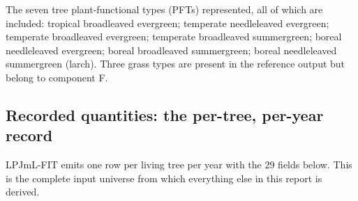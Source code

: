 \documentclass[11pt]{article}
\begin{document}
The seven tree plant-functional types (PFTs) represented, all of which are included: tropical broadleaved evergreen; temperate needleleaved evergreen; temperate broadleaved evergreen; temperate broadleaved summergreen; boreal needleleaved evergreen; boreal broadleaved summergreen; boreal needleleaved summergreen (larch). Three grass types are present in the reference output but belong to component F.

\subsection{Recorded quantities: the per-tree, per-year record}
\label{sec:recorded}

LPJmL-FIT emits one row per living tree per year with the 29 fields below. This is the complete input universe from which everything else in this report is derived.
\end{document}
